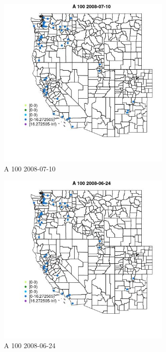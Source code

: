 \begin{figure} 
\centering  
\includegraphics[width=0.77\textwidth]{Code_Outputs/Report_ML_input_PM25_Step4_part_e_de_duplicated_aves_MapObsA_1002008-07-10.jpg} 
\caption{\label{fig:Report_ML_input_PM25_Step4_part_e_de_duplicated_avesMapObsA_1002008-07-10}A 100 2008-07-10} 
\end{figure} 
 

\begin{figure} 
\centering  
\includegraphics[width=0.77\textwidth]{Code_Outputs/Report_ML_input_PM25_Step4_part_e_de_duplicated_aves_MapObsA_1002008-06-24.jpg} 
\caption{\label{fig:Report_ML_input_PM25_Step4_part_e_de_duplicated_avesMapObsA_1002008-06-24}A 100 2008-06-24} 
\end{figure} 
 

